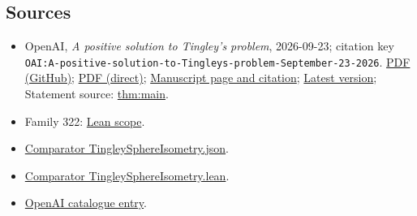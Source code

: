 \documentclass[11pt]{article}
\begin{document}
\subsection{Sources}
\begin{itemize}
\item OpenAI, \emph{A positive solution to Tingley's problem}, 2026-09-23; citation key \texttt{OAI:A-positive-solution-to-Tingleys-problem-September-23-2026}. \href{https://github.com/openai/math/blob/adc7f1241b42e322a6451854ab7e4b4c146bf78a/preprints/A-positive-solution-to-Tingleys-problem-September-23-2026/paper.pdf}{PDF (GitHub)}; \href{https://github.com/openai/math/raw/adc7f1241b42e322a6451854ab7e4b4c146bf78a/preprints/A-positive-solution-to-Tingleys-problem-September-23-2026/paper.pdf}{PDF (direct)}; \href{https://github.com/openai/math/blob/adc7f1241b42e322a6451854ab7e4b4c146bf78a/preprints/A-positive-solution-to-Tingleys-problem-September-23-2026/README.md}{Manuscript page and citation}; \href{https://github.com/openai/math/blob/main/preprints/A-positive-solution-to-Tingleys-problem-September-23-2026/paper.pdf}{Latest version}; Statement source: \href{https://github.com/openai/math/blob/adc7f1241b42e322a6451854ab7e4b4c146bf78a/preprints/A-positive-solution-to-Tingleys-problem-September-23-2026/build/main.tex\#L51}{thm:main}.
\item Family 322: \href{https://github.com/openai/math/blob/adc7f1241b42e322a6451854ab7e4b4c146bf78a/lean/docs/322.md}{Lean scope}.
\item \href{https://github.com/openai/math/blob/adc7f1241b42e322a6451854ab7e4b4c146bf78a/lean/ComparatorChallenges/TingleySphereIsometry.json}{Comparator TingleySphereIsometry.json}.
\item \href{https://github.com/openai/math/blob/adc7f1241b42e322a6451854ab7e4b4c146bf78a/lean/ComparatorChallenges/TingleySphereIsometry.lean}{Comparator TingleySphereIsometry.lean}.
\item \href{https://github.com/openai/math/blob/adc7f1241b42e322a6451854ab7e4b4c146bf78a/CONTENTS.md}{OpenAI catalogue entry}.
\end{itemize}
\end{document}
